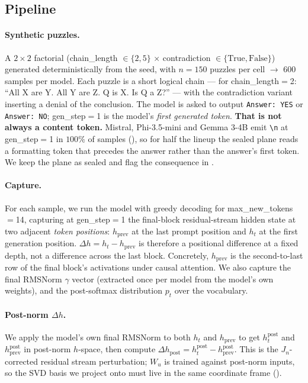 \documentclass[10pt, letterpaper]{article}
\renewcommand{\dh}{\Delta h}
\newcommand{\dhpost}{\Delta h_{\text{post}}}
\newcommand{\Wu}{W_u}
\newcommand{\Jn}{J_n}
\begin{document}
\subsection{Pipeline}
\label{sec:methods:pipeline}

\paragraph{Synthetic puzzles.}
A $2\times 2$ factorial (chain\_length $\in \{2, 5\}$ $\times$
contradiction $\in \{\text{True}, \text{False}\}$) generated
deterministically from the seed, with $n=150$ puzzles per cell $\to$
600 samples per model. Each puzzle is a short logical chain --- for
chain\_length$=$2: ``All X are Y. All Y are Z. Q is X. Is Q a Z?'' ---
with the contradiction variant inserting a denial of the conclusion.
The model is asked to output \texttt{Answer: YES} or \texttt{Answer:
NO}; gen\_step$=$1 is the model's \emph{first generated token}.
\textbf{That is not always a content token.} Mistral, Phi-3.5-mini and
Gemma 3-4B emit \texttt{\textbackslash n} at gen\_step$=$1 in
$100\%$ of samples (), so for half the lineup the
sealed plane reads a formatting token that precedes the answer rather
than the answer's first token. We keep the plane as sealed and flag the
consequence in .

\paragraph{Capture.}
For each sample, we run the model with greedy decoding for
max\_new\_tokens$=$14, capturing at gen\_step$=$1 the final-block
residual-stream hidden state at two adjacent \emph{token positions}:
$h_{\text{prev}}$ at the last prompt position and $h_t$ at the first
generation position. $\dh = h_t - h_{\text{prev}}$ is therefore a
positional difference at a fixed depth, not a difference across the
last block. Concretely, $h_{\text{prev}}$ is the second-to-last row of
the final block's activations under causal attention. We also capture
the final RMSNorm $\gamma$ vector
(extracted once per model from the model's own weights), and the
post-softmax distribution $p_t$ over the vocabulary.

\paragraph{Post-norm $\dh$.}
We apply the model's own final RMSNorm to both $h_t$ and
$h_{\text{prev}}$ to get $h_t^{\text{post}}$ and
$h_{\text{prev}}^{\text{post}}$ in post-norm $h$-space, then compute
$\dhpost = h_t^{\text{post}} - h_{\text{prev}}^{\text{post}}$. This is
the $\Jn$-corrected residual stream perturbation; $\Wu$ is trained
against post-norm inputs, so the SVD basis we project onto must live
in the same coordinate frame ().
\end{document}
